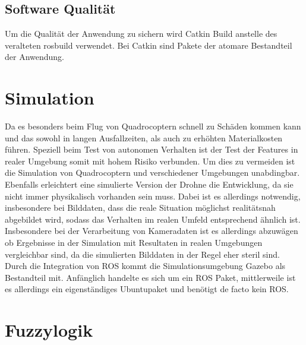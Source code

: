 
\subsection{Software Qualität}
Um die Qualität der Anwendung zu sichern wird Catkin Build anstelle des veralteten rosbuild verwendet. Bei Catkin sind Pakete der atomare Bestandteil der Anwendung.

\section{Simulation}
Da es besonders beim Flug von Quadrocoptern schnell zu Schäden kommen kann und das sowohl  in langen Ausfallzeiten, als auch zu erhöhten Materialkosten führen. Speziell beim Test von autonomen Verhalten ist der Test der Features in realer Umgebung somit mit hohem Risiko verbunden. Um dies zu vermeiden ist die Simulation von Quadrocoptern und verschiedener Umgebungen unabdingbar. Ebenfalls erleichtert eine simulierte Version der Drohne die Entwicklung, da sie nicht immer physikalisch vorhanden sein muss. Dabei ist es allerdings notwendig, insbesondere
bei Bilddaten, dass die reale Situation möglichst realitätsnah abgebildet wird, sodass
das Verhalten im realen Umfeld entsprechend ähnlich ist. Insbesondere bei der
Verarbeitung von Kameradaten ist es allerdings abzuwägen ob Ergebnisse in der Simulation
mit Resultaten in realen Umgebungen vergleichbar sind, da die simulierten
Bilddaten in der Regel eher steril sind.\newline
Durch die Integration von ROS kommt die Simulationsumgebung Gazebo als Bestandteil
mit. Anfänglich handelte es sich um ein ROS Paket, mittlerweile ist es allerdings
ein eigenständiges Ubuntupaket und benötigt de facto kein ROS. 


\section{Fuzzylogik}


